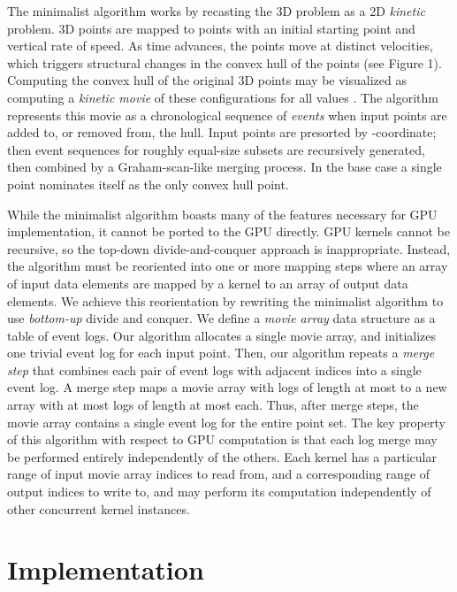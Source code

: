 \documentclass{article}
\begin{document}
The minimalist algorithm works by recasting the 3D problem as a 2D \emph{kinetic} problem. 3D  points are mapped to  points with an initial  starting point and  vertical rate of speed. As time  advances, the points move at distinct velocities, which triggers structural changes in the convex hull of the points (see Figure 1). Computing the convex hull of the original 3D points may be visualized as computing a \emph{kinetic movie} of these configurations for all values . The algorithm represents this movie as a chronological sequence of \emph{events} when input points are added to, or removed from, the hull. Input points are presorted by -coordinate; then event sequences for roughly equal-size subsets are recursively generated, then combined by a Graham-scan-like  merging process. In the base case a single point nominates itself as the only convex hull point.

While the minimalist algorithm boasts many of the features necessary for GPU implementation, it cannot be ported to the GPU directly. GPU kernels cannot be recursive, so the top-down divide-and-conquer approach is inappropriate. Instead, the algorithm must be reoriented into one or more mapping steps where an array of input data elements are mapped by a kernel to an array of output data elements. We achieve this reorientation by rewriting the minimalist algorithm to use \emph{bottom-up} divide and conquer. We define a \emph{movie array} data structure as a table of event logs. Our algorithm allocates a single movie array, and initializes one trivial event log for each input point. Then, our algorithm repeats a \emph{merge step} that combines each pair of event logs with adjacent indices into a single event log. A merge step maps a movie array with  logs of length at most  to a new array with at most  logs of length at most  each. Thus, after  merge steps, the movie array contains a single event log for the entire point set. The key property of this algorithm with respect to GPU computation is that each log merge may be performed entirely independently of the others. Each kernel has a particular range of input movie array indices to read from, and a corresponding range of output indices to write to, and may perform its computation independently of other concurrent kernel instances.

\section{Implementation}
\end{document}
